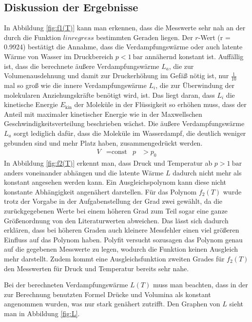 \subsection{Diskussion der Ergebnisse}
In Abbildung \ref{fig:f1(T)} kann man erkennen, dass die Messwerte sehr nah
an der durch die Funktion $linregress$ bestimmten Geraden liegen. Der $r$-Wert
(r = 0.9924) bestätigt die Annahme, dass die Verdampfungswärme oder auch
latente Wärme von Wasser im
Druckbereich $p < \SI{1}{\bar}$ annähernd konstant ist. Auffällig ist, dass
die berechnete äußere Verdampfungswärme $L_a$, die zur Volumenausdehnung und
damit zur Druckerhöhung im Gefäß nötig ist, nur $\frac{1}{10}$ mal so groß wie
die innere Verdampfungswärme
$L_i$, die zur Überwindung der molekularen Anziehungskräfte
benötigt wird, ist.
Das liegt daran, dass $L_i$ die kinetische Energie $E_\text{kin}$ der Moleküle in
der Flüssigkeit so erhöhen muss, dass der Anteil mit maximaler kinetischer
Energie wie in der Maxwellschen Geschwindigkeitsverteilung beschrieben wächst.
Die äußere Verdampfungswärme $L_a$ sorgt lediglich dafür, dass die Moleküle
im Wasserdampf, die deutlich weniger gebunden sind und mehr Platz haben,
zusammengedrückt werden.
\begin{align}
  V & = \text{const} & p & > p_0
\end{align}
In Abbildung \ref{fig:f2(T)} erkennt man, dass Druck und Temperatur ab
$p > \SI{1}{\bar}$ anders voneinander abhängen und die latente Wärme $L$
dadurch nicht mehr als konstant angesehen werden kann. Ein Ausgleichspolynom
kann diese nicht konstante Abhängigkeit angenähert darstellen.
Für das Polynom $f_2(T)$ wurde trotz der Vorgabe in der Aufgabenstellung
der Grad zwei gewählt, da die zurückgegebenen Werte
bei einem höheren Grad zum Teil sogar eine ganze Größenordnung von den
Literaturwerten abweichen.
Das lässt sich dadurch erklären, dass bei höheren Graden auch kleinere
Messfehler einen viel größeren Einfluss auf das Polynom haben. Polyfit
versucht sozusagen das Polynom genau auf die gegebenen Messwerte zu legen,
wodurch die Funktion keinen Ausgleich mehr darstellt.
Zudem kommt eine Ausgleichsfunktion zweiten Grades für $f_2(T)$
den Messwerten für Druck und Temperatur bereits sehr nahe.

Bei der berechneten Verdampfungswärme $L(T)$ muss man beachten, dass in der
zur Berechnung benutzten Formel Drücke und Volumina als konstant
angenommen wurden, was nur stark genähert zutrifft. Den Graphen von $L$ sieht
man in Abbildung \ref{fig:L}.

\newpage

